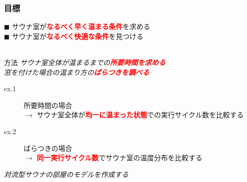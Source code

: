 \documentclass[unicode, 9pt, aspectratio=169]{beamer}
\begin{document}
\begin{frame}
  \frametitle{目標}
  $\blacksquare$ サウナ室が\textbf{\textcolor{red}{なるべく早く温まる条件}}を求める\\
  $\blacksquare$ サウナ室が\textbf{\textcolor{red}{なるべく快適な条件}}を見つける\\
  \hrulefill\\
  \centering
  \begin{minipage}{.7\linewidth}
    \begin{exampleblock}{方法}
        \centering
        \Large \emph{サウナ室全体が温まるまでの\textbf{\textcolor{red}{所要時間を求める}}}\\
        \Large \emph{窓を付けた場合の温まり方の\textbf{\textcolor{red}{ばらつきを調べる}}}
    \end{exampleblock}
  \end{minipage}  

  \begin{description}
    \item[ex.1] 所要時間の場合\\
  $\to$ サウナ室全体が\textbf{\textcolor{red}{均一に温まった状態}}での実行サイクル数を比較する
    \item[ex.2] ばらつきの場合\\
  $\to$ \textbf{\textcolor{red}{同一実行サイクル数}}でサウナ室の温度分布を比較する
  \end{description}
  \centering
  \begin{minipage}{.5\linewidth}
    \begin{alertblock}{}
        \centering
        \Large \emph{対流型サウナの部屋のモデルを作成する}
    \end{alertblock}
  \end{minipage}
\end{frame}
\end{document}
